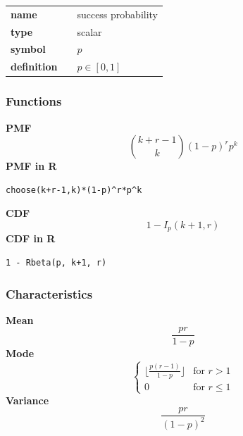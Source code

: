 \noindent\begin{tabular}{p{2cm}cl}
\textbf{name} & & success probability \\
\textbf{type} & & scalar \\
\textbf{symbol} & & $p$  \\
\textbf{definition} & & $p \in [0,1]$
\end{tabular}
\subsubsection*{Functions}

\smallskip \noindent \hspace{.2cm} \textbf{PMF} 
\begin{equation*}\binom {k+r-1}k (1-p)^r p^k\end{equation*}
\smallskip \noindent \hspace{.2cm} \textbf{PMF in R}  
\begin{verbatim}choose(k+r-1,k)*(1-p)^r*p^k\end{verbatim}
\smallskip \noindent \hspace{.2cm} \textbf{CDF} 
\begin{equation*}1 - I_{p}(k+1, r)\end{equation*}
\smallskip \noindent \hspace{.2cm} \textbf{CDF in R} 
\begin{verbatim}1 - Rbeta(p, k+1, r)\end{verbatim}
\smallskip
\subsubsection*{Characteristics}
\smallskip \noindent \hspace{.2cm} \textbf{Mean} 
\begin{equation*}\frac{pr}{1-p}\end{equation*}
\smallskip \noindent \hspace{.2cm} \textbf{Mode} 
\begin{equation*}\begin{cases}
\lfloor \frac{p(r-1)}{1-p} \rfloor & \text{for } r > 1 \\ 
0 & \text{for } r \leq 1 
\end{cases}\end{equation*}
\smallskip \noindent \hspace{.2cm} \textbf{Variance} 
\begin{equation*}\frac{pr}{(1-p)^2}\end{equation*}
\smallskip
